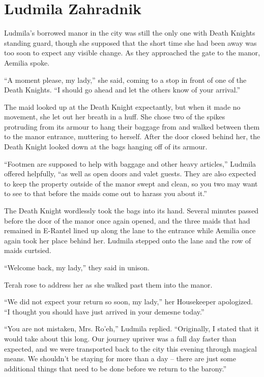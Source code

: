 \chapter{Ludmila Zahradnik}

Ludmila’s borrowed manor in the city was still the only one with Death Knights standing guard, though she supposed that the short time she had been away was too soon to expect any visible change. As they approached the gate to the manor, Aemilia spoke.

 

“A moment please, my lady,” she said, coming to a stop in front of one of the Death Knights. “I should go ahead and let the others know of your arrival.”

 

The maid looked up at the Death Knight expectantly, but when it made no movement, she let out her breath in a huff. She chose two of the spikes protruding from its armour to hang their baggage from and walked between them to the manor entrance, muttering to herself. After the door closed behind her, the Death Knight looked down at the bags hanging off of its armour.

 

“Footmen are supposed to help with baggage and other heavy articles,” Ludmila offered helpfully, “as well as open doors and valet guests. They are also expected to keep the property outside of the manor swept and clean, so you two may want to see to that before the maids come out to harass you about it.”

 

The Death Knight wordlessly took the bags into its hand. Several minutes passed before the door of the manor once again opened, and the three maids that had remained in E-Rantel lined up along the lane to the entrance while Aemilia once again took her place behind her. Ludmila stepped onto the lane and the row of maids curtsied.

 

“Welcome back, my lady,” they said in unison.

 

Terah rose to address her as she walked past them into the manor.

 

“We did not expect your return so soon, my lady,” her Housekeeper apologized. “I thought you should have just arrived in your demesne today.”

 

“You are not mistaken, Mrs. Ro’eh,” Ludmila replied. “Originally, I stated that it would take about this long. Our journey upriver was a full day faster than expected, and we were transported back to the city this evening through magical means. We shouldn’t be staying for more than a day – there are just some additional things that need to be done before we return to the barony.”

